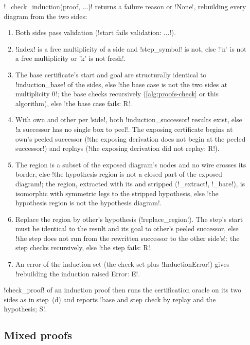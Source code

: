 \begin{algorithm}\label{alg:proofs-check-induction}
\py!_check_induction(proof, ...)! returns a failure reason or \py!None!, rebuilding every diagram from the two sides:
\begin{enumerate}
\item Both sides pass validation (\code!start fails validation: ...!).
\item \py!index! is a free multiplicity of a side and \py!step_symbol! is not, else \code!'n' is not a free multiplicity or 'k' is not fresh!.
\item The base certificate's start and goal are structurally identical to \py!induction_base! of the sides, else \code!the base case is not the two sides at multiplicity 0!; the base checks recursively (\cref{alg:proofs-check} or this algorithm), else \code!the base case fails: R!.
\item With own and other per \py!side!, both \py!induction_successor! results exist, else \code!a successor has no single box to peel!. The exposing certificate begins at own's peeled successor (\code!the exposing derivation does not begin at the peeled successor!) and replays (\code!the exposing derivation did not replay: R!).
\item The region is a subset of the exposed diagram's nodes and no wire crosses its border, else \code!the hypothesis region is not a closed part of the exposed diagram!; the region, extracted with its \bboxes{} and stripped (\py!_extract!, \py!_bare!), is isomorphic with symmetric legs to the stripped hypothesis, else \code!the hypothesis region is not the hypothesis diagram!.
\item Replace the region by other's hypothesis (\py!replace_region!). The step's start must be identical to the result and its goal to other's peeled successor, else \code!the step does not run from the rewritten successor to the other side's!; the step checks recursively, else \code!the step fails: R!.
\item An error of the induction set (the check set plus \py!InductionError!) gives \code!rebuilding the induction raised Error: E!.
\end{enumerate}
\py!check_proof! of an induction proof then runs the certification oracle on its two sides as in step~(d) and reports \code!base and step check by replay and the hypothesis; S!.
\end{algorithm}

\subsection{Mixed proofs}

